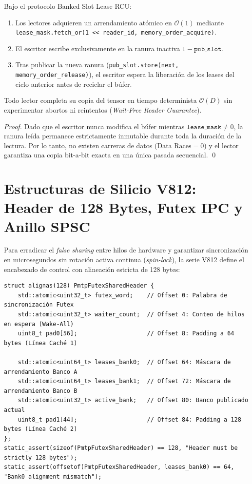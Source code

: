 \begin{theorem}
\label{thm:rcu_starvation_free}
Bajo el protocolo Banked Slot Lease RCU:
\begin{enumerate}
    \item Los lectores adquieren un arrendamiento atómico en $\mathcal{O}(1)$ mediante \texttt{lease\_mask.fetch\_or(1 << reader\_id, memory\_order\_acquire)}.
    \item El escritor escribe exclusivamente en la ranura inactiva $1 - \texttt{pub\_slot}$.
    \item Tras publicar la nueva ranura (\texttt{pub\_slot.store(next, memory\_order\_release)}), el escritor espera la liberación de los leases del ciclo anterior antes de reciclar el búfer.
\end{enumerate}
Todo lector completa su copia del tensor en tiempo determinista $\mathcal{O}(D)$ sin experimentar abortos ni reintentos (\emph{Wait-Free Reader Guarantee}).
\end{theorem}

\begin{proof}
Dado que el escritor nunca modifica el búfer mientras $\texttt{lease\_mask} \neq 0$, la ranura leída permanece estrictamente inmutable durante toda la duración de la lectura. Por lo tanto, no existen carreras de datos ($\text{Data Races} = 0$) y el lector garantiza una copia bit-a-bit exacta en una única pasada secuencial. \qed
\end{proof}

\section{Estructuras de Silicio V812: Header de 128 Bytes, Futex IPC y Anillo SPSC}
\label{sec:v812_structures}

Para erradicar el \emph{false sharing} entre hilos de hardware y garantizar sincronización en microsegundos sin rotación activa continua (\emph{spin-lock}), la serie V812 define el encabezado de control con alineación estricta de 128 bytes:

\begin{lstlisting}[style=cppstyle, caption={Estructura de Encabezado IPC Futex de 128 Bytes}, label=lst:futex_header]
struct alignas(128) PmtpFutexSharedHeader {
    std::atomic<uint32_t> futex_word;    // Offset 0: Palabra de sincronización Futex
    std::atomic<uint32_t> waiter_count;  // Offset 4: Conteo de hilos en espera (Wake-All)
    uint8_t pad0[56];                    // Offset 8: Padding a 64 bytes (Línea Caché 1)
    
    std::atomic<uint64_t> leases_bank0;  // Offset 64: Máscara de arrendamiento Banco A
    std::atomic<uint64_t> leases_bank1;  // Offset 72: Máscara de arrendamiento Banco B
    std::atomic<uint32_t> active_bank;   // Offset 80: Banco publicado actual
    uint8_t pad1[44];                    // Offset 84: Padding a 128 bytes (Línea Caché 2)
};
static_assert(sizeof(PmtpFutexSharedHeader) == 128, "Header must be strictly 128 bytes");
static_assert(offsetof(PmtpFutexSharedHeader, leases_bank0) == 64, "Bank0 alignment mismatch");
\end{lstlisting}


